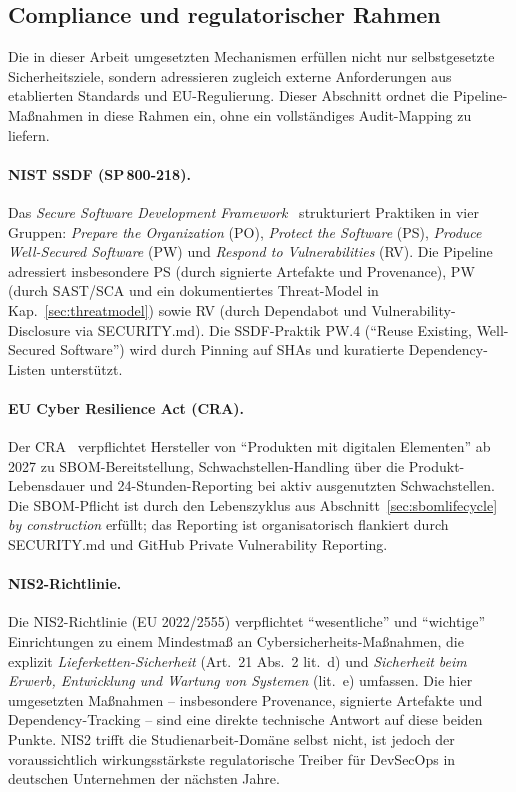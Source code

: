 \documentclass[12pt, a4paper]{scrartcl}
\begin{document}
\subsection{Compliance und regulatorischer Rahmen}\label{sec:compliance}
Die in dieser Arbeit umgesetzten Mechanismen erfüllen nicht nur
selbstgesetzte Sicherheitsziele, sondern adressieren zugleich
externe Anforderungen aus etablierten Standards und
EU-Regulierung. Dieser Abschnitt ordnet die Pipeline-Maßnahmen in
diese Rahmen ein, ohne ein vollständiges Audit-Mapping zu liefern.

\paragraph{NIST SSDF (SP\,800-218).}
Das \emph{Secure Software Development Framework}~\cite{ssdf}
strukturiert Praktiken in vier Gruppen:
\emph{Prepare the Organization} (PO), \emph{Protect the Software}
(PS), \emph{Produce Well-Secured Software} (PW) und \emph{Respond to
Vulnerabilities} (RV). Die Pipeline adressiert insbesondere PS
(durch signierte Artefakte und Provenance), PW (durch SAST/SCA und
ein dokumentiertes Threat-Model in Kap.~\ref{sec:threatmodel}) sowie
RV (durch Dependabot und Vulnerability-Disclosure via SECURITY.md).
Die SSDF-Praktik PW.4 (\enquote{Reuse Existing, Well-Secured Software})
wird durch Pinning auf SHAs und kuratierte Dependency-Listen
unterstützt.

\paragraph{EU Cyber Resilience Act (CRA).}
Der CRA~\cite{cra} verpflichtet Hersteller von \enquote{Produkten mit
digitalen Elementen} ab 2027 zu SBOM-Bereitstellung,
Schwachstellen-Handling über die Produkt-Lebensdauer und
24-Stunden-Reporting bei aktiv ausgenutzten Schwachstellen. Die
SBOM-Pflicht ist durch den Lebenszyklus aus
Abschnitt~\ref{sec:sbomlifecycle} \emph{by construction} erfüllt;
das Reporting ist organisatorisch flankiert durch SECURITY.md und
GitHub Private Vulnerability Reporting.

\paragraph{NIS2-Richtlinie.}
Die NIS2-Richtlinie (EU 2022/2555) verpflichtet \enquote{wesentliche}
und \enquote{wichtige} Einrichtungen zu einem Mindestmaß an
Cybersicherheits-Maßnahmen, die explizit \emph{Lieferketten-Sicherheit}
(Art.\ 21 Abs.\ 2 lit.\ d) und \emph{Sicherheit beim Erwerb,
Entwicklung und Wartung von Systemen} (lit.\ e) umfassen. Die
hier umgesetzten Maßnahmen -- insbesondere Provenance, signierte
Artefakte und Dependency-Tracking -- sind eine direkte technische
Antwort auf diese beiden Punkte. NIS2 trifft die Studienarbeit-Domäne
selbst nicht, ist jedoch der voraussichtlich wirkungsstärkste
regulatorische Treiber für DevSecOps in deutschen Unternehmen der
nächsten Jahre.
\end{document}
